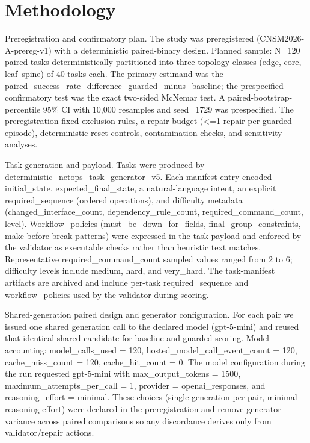 \documentclass[conference]{IEEEtran}
\begin{document}
\section{Methodology}
Preregistration and confirmatory plan. The study was preregistered (CNSM2026-A-prereg-v1) with a deterministic paired-binary design. Planned sample: N=120 paired tasks deterministically partitioned into three topology classes (edge, core, leaf--spine) of 40 tasks each. The primary estimand was the paired\_success\_rate\_difference\_guarded\_minus\_baseline; the prespecified confirmatory test was the exact two-sided McNemar test. A paired-bootstrap-percentile 95\% CI with 10,000 resamples and seed=1729 was prespecified. The preregistration fixed exclusion rules, a repair budget (<=1 repair per guarded episode), deterministic reset controls, contamination checks, and sensitivity analyses.

Task generation and payload. Tasks were produced by deterministic\_netops\_task\_generator\_v5. Each manifest entry encoded initial\_state, expected\_final\_state, a natural-language intent, an explicit required\_sequence (ordered operations), and difficulty metadata (changed\_interface\_count, dependency\_rule\_count, required\_command\_count, level). Workflow\_policies (must\_be\_down\_for\_fields, final\_group\_constraints, make-before-break patterns) were expressed in the task payload and enforced by the validator as executable checks rather than heuristic text matches. Representative required\_command\_count sampled values ranged from 2 to 6; difficulty levels include medium, hard, and very\_hard. The task-manifest artifacts are archived and include per-task required\_sequence and workflow\_policies used by the validator during scoring.

Shared-generation paired design and generator configuration. For each pair we issued one shared generation call to the declared model (gpt-5-mini) and reused that identical shared candidate for baseline and guarded scoring. Model accounting: model\_calls\_used = 120, hosted\_model\_call\_event\_count = 120, cache\_miss\_count = 120, cache\_hit\_count = 0. The model configuration during the run requested gpt-5-mini with max\_output\_tokens = 1500, maximum\_attempts\_per\_call = 1, provider = openai\_responses, and reasoning\_effort = minimal. These choices (single generation per pair, minimal reasoning effort) were declared in the preregistration and remove generator variance across paired comparisons so any discordance derives only from validator/repair actions.
\end{document}
